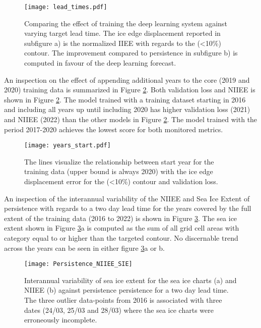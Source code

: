 \documentclass[../main/thesis]{subfiles}
\begin{document}
\begin{figure}
    \centering
    \texttt{[image: lead\_times.pdf]}
    \caption{\label{fig:lead_times}Comparing the effect of training the deep learning system against varying target lead time. The ice edge displacement reported in subfigure a) is the normalized IIEE with regards to the (<10\%) contour. The improvement compared to persistence in subfigure b) is computed in favour of the deep learning forecast.}
\end{figure}

An inspection on the effect of appending additional years to the core (2019 and 2020) training data is summarized in Figure \ref{fig:append_years}. Both validation loss and NIIEE is shown in Figure \ref{fig:append_years}. The model trained with a training dataset starting in 2016 and including all years up until including 2020 has higher validation loss (2021) and NIIEE (2022) than the other models in Figure \ref{fig:append_years}. The model trained with the period 2017-2020 achieves the lowest score for both monitored metrics.

\begin{figure}
    \centering
    \texttt{[image: years\_start.pdf]}
    \caption{\label{fig:append_years}The lines visualize the relationship between start year for the training data (upper bound is always 2020) with the ice edge displacement error for the (<10\%) contour and validation loss.}
\end{figure}

An inspection of the interannual variability of the NIIEE and Sea Ice Extent of persistence with regards to a two day lead time for the years covered by the full extent of the training data (2016 to 2022) is shown in Figure \ref{fig:NIIEE-and-SIE}. The sea ice extent shown in Figure \ref{fig:NIIEE-and-SIE}a is computed as the sum of all grid cell areas with category equal to or higher than the targeted contour. No discernable trend across the years can be seen in either figure \ref{fig:NIIEE-and-SIE}a or b.

\begin{figure}
    \centering
    \texttt{[image: Persistence\_NIIEE\_SIE]}
    \caption{\label{fig:NIIEE-and-SIE}Interannual variability of sea ice extent for the sea ice charts (a) and NIIEE (b) against persistence persistence for a two day lead time. The three outlier data-points from 2016 is associated with three dates (24/03, 25/03 and 28/03) where the sea ice charts were erroneously incomplete.}
\end{figure}
\end{document}
